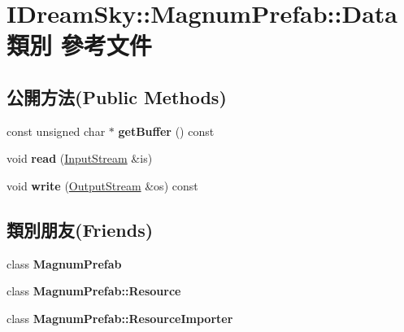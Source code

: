 \hypertarget{class_i_dream_sky_1_1_magnum_prefab_1_1_data}{}\section{I\+Dream\+Sky\+:\+:Magnum\+Prefab\+:\+:Data 類別 參考文件}
\label{class_i_dream_sky_1_1_magnum_prefab_1_1_data}
\subsection*{公開方法(Public Methods)}
\begin{DoxyCompactItemize}
\item 
const unsigned char $\ast$ {\bfseries get\+Buffer} () const \hypertarget{class_i_dream_sky_1_1_magnum_prefab_1_1_data_a65c3232ed4579927efb66b0566196c12}{}\label{class_i_dream_sky_1_1_magnum_prefab_1_1_data_a65c3232ed4579927efb66b0566196c12}

\item 
void {\bfseries read} (\hyperlink{class_i_dream_sky_1_1_input_stream}{Input\+Stream} \&is)\hypertarget{class_i_dream_sky_1_1_magnum_prefab_1_1_data_aad174072e5a3c31544b1cc58b555ba1b}{}\label{class_i_dream_sky_1_1_magnum_prefab_1_1_data_aad174072e5a3c31544b1cc58b555ba1b}

\item 
void {\bfseries write} (\hyperlink{class_i_dream_sky_1_1_output_stream}{Output\+Stream} \&os) const \hypertarget{class_i_dream_sky_1_1_magnum_prefab_1_1_data_a2de71c850e6a24bd8e0e7c2e1c6876a7}{}\label{class_i_dream_sky_1_1_magnum_prefab_1_1_data_a2de71c850e6a24bd8e0e7c2e1c6876a7}

\end{DoxyCompactItemize}
\subsection*{類別朋友(Friends)}
\begin{DoxyCompactItemize}
\item 
class {\bfseries Magnum\+Prefab}\hypertarget{class_i_dream_sky_1_1_magnum_prefab_1_1_data_af673f35827b6a2ca5306beed6f132f97}{}\label{class_i_dream_sky_1_1_magnum_prefab_1_1_data_af673f35827b6a2ca5306beed6f132f97}

\item 
class {\bfseries Magnum\+Prefab\+::\+Resource}\hypertarget{class_i_dream_sky_1_1_magnum_prefab_1_1_data_a96406f0ce756fc948a514e9f70ce0305}{}\label{class_i_dream_sky_1_1_magnum_prefab_1_1_data_a96406f0ce756fc948a514e9f70ce0305}

\item 
class {\bfseries Magnum\+Prefab\+::\+Resource\+Importer}\hypertarget{class_i_dream_sky_1_1_magnum_prefab_1_1_data_a4eb47515c2ca88e47be1dcbb51810ba6}{}\label{class_i_dream_sky_1_1_magnum_prefab_1_1_data_a4eb47515c2ca88e47be1dcbb51810ba6}

\end{DoxyCompactItemize}


